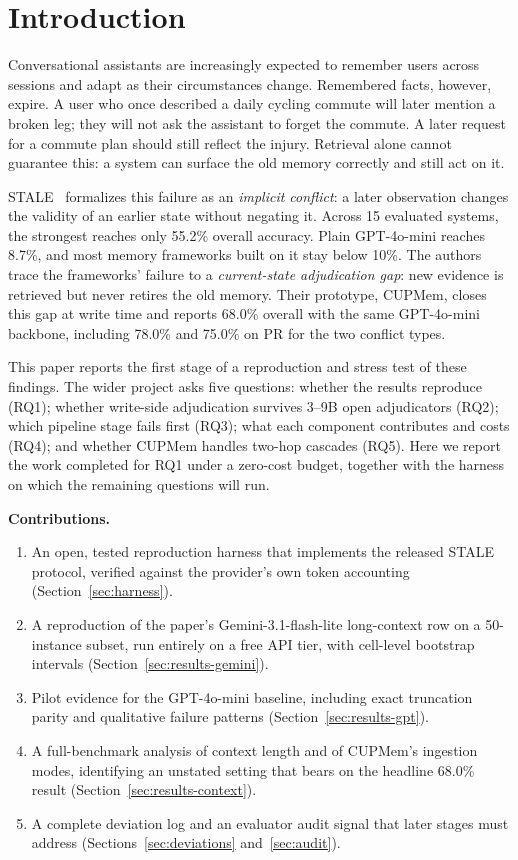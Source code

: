 \documentclass[conference]{IEEEtran}
\begin{document}
\section{Introduction}
Conversational assistants are increasingly expected to remember users across sessions and adapt as their circumstances change. Remembered facts, however, expire. A user who once described a daily cycling commute will later mention a broken leg; they will not ask the assistant to forget the commute. A later request for a commute plan should still reflect the injury. Retrieval alone cannot guarantee this: a system can surface the old memory correctly and still act on it.

STALE~\cite{chao2026stale} formalizes this failure as an \emph{implicit conflict}: a later observation changes the validity of an earlier state without negating it. Across 15 evaluated systems, the strongest reaches only 55.2\% overall accuracy. Plain GPT-4o-mini reaches 8.7\%, and most memory frameworks built on it stay below 10\%. The authors trace the frameworks' failure to a \emph{current-state adjudication gap}: new evidence is retrieved but never retires the old memory. Their prototype, CUPMem, closes this gap at write time and reports 68.0\% overall with the same GPT-4o-mini backbone, including 78.0\% and 75.0\% on PR for the two conflict types.

This paper reports the first stage of a reproduction and stress test of these findings. The wider project asks five questions: whether the results reproduce (RQ1); whether write-side adjudication survives 3--9B open adjudicators (RQ2); which pipeline stage fails first (RQ3); what each component contributes and costs (RQ4); and whether CUPMem handles two-hop cascades (RQ5). Here we report the work completed for RQ1 under a zero-cost budget, together with the harness on which the remaining questions will run.

\textbf{Contributions.}
\begin{enumerate}
\item An open, tested reproduction harness that implements the released STALE protocol, verified against the provider's own token accounting (Section~\ref{sec:harness}).
\item A reproduction of the paper's Gemini-3.1-flash-lite long-context row on a 50-instance subset, run entirely on a free API tier, with cell-level bootstrap intervals (Section~\ref{sec:results-gemini}).
\item Pilot evidence for the GPT-4o-mini baseline, including exact truncation parity and qualitative failure patterns (Section~\ref{sec:results-gpt}).
\item A full-benchmark analysis of context length and of CUPMem's ingestion modes, identifying an unstated setting that bears on the headline 68.0\% result (Section~\ref{sec:results-context}).
\item A complete deviation log and an evaluator audit signal that later stages must address (Sections~\ref{sec:deviations} and~\ref{sec:audit}).
\end{enumerate}
\end{document}
